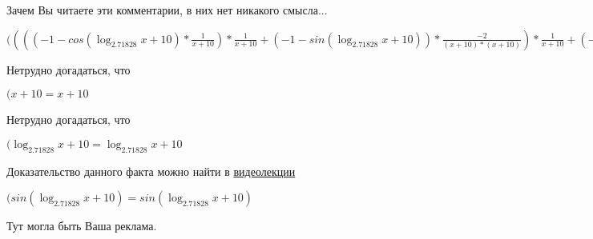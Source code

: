 \documentclass[12pt,a4paper,fleqn]{article}
\theoremstyle{definition}
\begin{document}
Зачем Вы читаете эти комментарии, в них нет никакого смысла...

$(((( -1  - cos(\log_{ 2.71828 }{ x  +  10 }) * \frac{ 1 }{ x  +  10 }
) * \frac{ 1 }{ x  +  10 }
 + ( -1  - sin(\log_{ 2.71828 }{ x  +  10 })) * \frac{ -2 }{( x  +  10 ) * ( x  +  10 )}
) * \frac{ 1 }{ x  +  10 }
 + ( -1  - sin(\log_{ 2.71828 }{ x  +  10 })) * \frac{ 1 }{ x  +  10 }
 * \frac{ -2 }{( x  +  10 ) * ( x  +  10 )}
 + ( -1  - sin(\log_{ 2.71828 }{ x  +  10 })) * \frac{ 1 }{ x  +  10 }
 * \frac{ -2 }{( x  +  10 ) * ( x  +  10 )}
 + cos(\log_{ 2.71828 }{ x  +  10 }) * \frac{ -1  -  -2  * ( x  +  10  +  x  +  10 )}{( x  +  10 ) * ( x  +  10 ) * ( x  +  10 ) * ( x  +  10 )}
) * { 3 }^{sin(\log_{ 2.71828 }{ x  +  10 })} + (( -1  - sin(\log_{ 2.71828 }{ x  +  10 })) * \frac{ 1 }{ x  +  10 }
 * \frac{ 1 }{ x  +  10 }
 + cos(\log_{ 2.71828 }{ x  +  10 }) * \frac{ -2 }{( x  +  10 ) * ( x  +  10 )}
) * cos(\log_{ 2.71828 }{ x  +  10 }) * \frac{ 1 }{ x  +  10 }
 * { 3 }^{sin(\log_{ 2.71828 }{ x  +  10 })} = ((( -1  - cos(\log_{ 2.71828 }{ x  +  10 }) * \frac{ 1 }{ x  +  10 }
) * \frac{ 1 }{ x  +  10 }
 + ( -1  - sin(\log_{ 2.71828 }{ x  +  10 })) * \frac{ -2 }{( x  +  10 ) * ( x  +  10 )}
) * \frac{ 1 }{ x  +  10 }
 + ( -1  - sin(\log_{ 2.71828 }{ x  +  10 })) * \frac{ 1 }{ x  +  10 }
 * \frac{ -2 }{( x  +  10 ) * ( x  +  10 )}
 + ( -1  - sin(\log_{ 2.71828 }{ x  +  10 })) * \frac{ 1 }{ x  +  10 }
 * \frac{ -2 }{( x  +  10 ) * ( x  +  10 )}
 + cos(\log_{ 2.71828 }{ x  +  10 }) * \frac{ -1  -  -2  * ( x  +  10  +  x  +  10 )}{( x  +  10 ) * ( x  +  10 ) * ( x  +  10 ) * ( x  +  10 )}
) * { 3 }^{sin(\log_{ 2.71828 }{ x  +  10 })} + (( -1  - sin(\log_{ 2.71828 }{ x  +  10 })) * \frac{ 1 }{ x  +  10 }
 * \frac{ 1 }{ x  +  10 }
 + cos(\log_{ 2.71828 }{ x  +  10 }) * \frac{ -2 }{( x  +  10 ) * ( x  +  10 )}
) * cos(\log_{ 2.71828 }{ x  +  10 }) * \frac{ 1 }{ x  +  10 }
 * { 3 }^{sin(\log_{ 2.71828 }{ x  +  10 })}$

Нетрудно догадаться, что

$( x  +  10  =  x  +  10 $

Нетрудно догадаться, что

$(\log_{ 2.71828 }{ x  +  10 } = \log_{ 2.71828 }{ x  +  10 }$

Доказательство данного факта можно найти в \href{https://www.youtube.com/watch?v=dQw4w9WgXcQ}{видеолекции}

$(sin(\log_{ 2.71828 }{ x  +  10 }) = sin(\log_{ 2.71828 }{ x  +  10 })$

Тут могла быть Ваша реклама.
\end{document}
